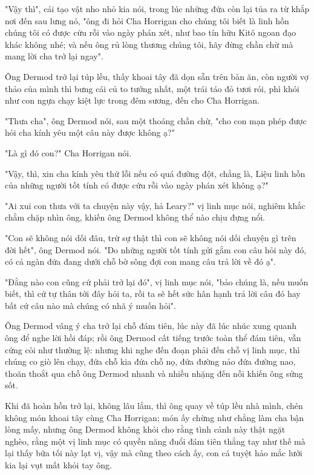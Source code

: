 "Vậy thì", cái tạo vật nho nhỏ kia nói, trong lúc những đứa còn lại tủa ra từ khắp nơi đến sau lưng nó, "ông đi hỏi Cha Horrigan cho chúng tôi biết là linh hồn chúng tôi có được cứu rỗi vào ngày phán xét, như bao tín hữu Kitô ngoan đạo khác không nhé; và nếu ông rủ lòng thương chúng tôi, hãy đừng chần chừ mà mang lời cha trở lại ngay".

Ông Dermod trở lại túp lều, thấy khoai tây đã dọn sẵn trên bàn ăn, còn người vợ thảo của mình thì bưng cái củ to tướng nhất, một trái táo đỏ tươi rói, phì khói như con ngựa chạy kiệt lực trong đêm sương, đến cho Cha Horrigan.

"Thưa cha", ông Dermod nói, sau một thoáng chần chừ, "cho con mạn phép được hỏi cha kính yêu một câu này được không ạ?"

"Là gì đó con?" Cha Horrigan nói.

"Vậy, thì, xin cha kính yêu thứ lỗi nếu có quá đường đột, chẳng là, Liệu linh hồn của những người tốt tính có được cứu rỗi vào ngày phán xét không ạ?"

"Ai xui con thưa với ta chuyện này vậy, hả Leary?" vị linh mục nói, nghiêm khắc chằm chặp nhìn ông, khiến ông Dermod không thể nào chịu đựng nổi.

"Con sẽ không nói dối đâu, trừ sự thật thì con sẽ không nói dối chuyện gì trên đời hết", ông Dermod nói. "Do những người tốt tính gửi gắm con câu hỏi này đó, có cả ngàn đứa đang dưới chỗ bờ sông đợi con mang câu trả lời về đó ạ".

"Đằng nào con cũng cứ phải trở lại đó", vị linh mục nói, "bảo chúng là, nếu muốn biết, thì cứ tự thân tới đây hỏi ta, rồi ta sẽ hết sức hân hạnh trả lời câu đó hay bất cứ câu nào mà chúng có nhã ý muốn hỏi".

Ông Dermod vâng ý cha trở lại chỗ đám tiên, lúc này đã lúc nhúc xung quanh ông để nghe lời hồi đáp; rồi ông Dermod cất tiếng trước toàn thể đám tiên, vẫn cứng cỏi như thường lệ: nhưng khi nghe đến đoạn phải đến chỗ vị linh mục, thì chúng co giò lên chạy, đứa chỗ kia đứa chỗ nọ, đứa đường nảo đứa đường nao, thoăn thoắt qua chỗ ông Dermod nhanh và nhiều nhặng đến nỗi khiến ông sửng sốt.

Khi đã hoàn hồn trở lại, không lâu lắm, thì ông quay về túp lều nhà mình, chén không món khoai tây cùng Cha Horrigan; món ấy chừng như chẳng làm cha bận lòng mấy, nhưng ông Dermod không khỏi cho rằng tình cảnh này thật ngặt nghèo, rằng một vị linh mục có quyền năng đuổi đám tiên thẳng tay như thế mà lại thấy bữa tối này lạt vị, vậy mà cũng theo cách ấy, con cá tuyệt hảo mắc lưới kia lại vụt mất khỏi tay ông.
